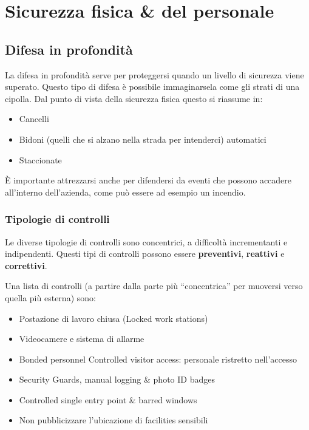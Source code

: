\part{Sicurezza fisica \& del personale}

\chapter{Difesa in profondità}

La difesa in profondità serve per proteggersi quando un livello di sicurezza 
viene superato. Questo tipo di difesa è possibile immaginarsela come gli strati 
di una cipolla. Dal punto di vista della sicurezza fisica questo si riassume in:
\begin{itemize}
\item Cancelli
\item Bidoni (quelli che si alzano nella strada per intenderci) automatici
\item Staccionate
\end{itemize}

È importante attrezzarsi anche per difendersi da eventi che possono accadere 
all'interno dell'azienda, come può essere ad esempio un incendio.

\section{Tipologie di controlli}

Le diverse tipologie di controlli sono concentrici, a difficoltà incrementanti e 
indipendenti. Questi tipi di controlli possono essere \textbf{preventivi}, 
\textbf{reattivi} e \textbf{correttivi}.

Una lista di controlli (a partire dalla parte più ``concentrica'' per muoversi 
verso quella più esterna) sono:

\begin{itemize}
\item Postazione di lavoro chiusa (Locked work stations)
\item Videocamere e sistema di allarme
\item Bonded personnel Controlled visitor access: personale ristretto 
nell'accesso
\item Security Guards, manual logging \& photo ID badges
\item Controlled single entry point \& barred windows
\item Non pubblicizzare l'ubicazione di facilities  
sensibili
\end{itemize}


